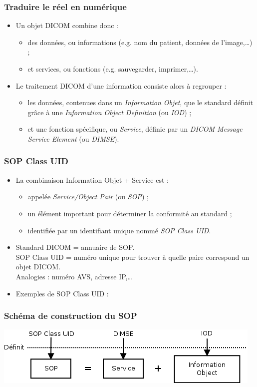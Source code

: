 	\frame
	{
		\frametitle{Traduire le r\'eel en num\'erique}
		
		\begin{itemize}
			\item Un objet DICOM combine donc :
			\begin{itemize}
				\item<2-> des donn\'ees, ou informations (e.g. nom du patient, donn\'ees de l'image,\ldots) ;
				\item<3-> et services, ou fonctions (e.g. sauvegarder, imprimer,\ldots).
			\end{itemize}
			
			\item<4-> Le traitement DICOM d'une information consiste alors \`a regrouper :
			\begin{itemize}
				\item<5-> les donn\'ees, contenues dans un \emph{Information Objet}, que le standard d\'efinit gr\^ace \`a une \emph{Information Object Definition} (ou \emph{IOD}) ;
				\item<6-> et une fonction sp\'ecifique, ou \emph{Service}, d\'efinie par un \emph{DICOM Message Service Element} (ou \emph{DIMSE}).
			\end{itemize}
		\end{itemize}
	}
	
	\frame
	{
		\frametitle{SOP Class UID}

		\begin{itemize}
			\item La combinaison Information Objet + Service est :
			\begin{itemize}
				\item<2-> appel\'ee \emph{Service/Object Pair} (ou \emph{SOP}) ;
				\item<3-> un \'el\'ement important pour d\'eterminer la conformit\'e au standard ;
				\item<4-> identifi\'ee par un identifiant unique nomm\'e \emph{SOP Class UID}.
			\end{itemize}
		
			\item<5-> Standard DICOM = annuaire de SOP.\\
			SOP Class UID = num\'ero unique pour trouver \`a quelle paire correspond un objet DICOM.\\
			Analogies : num\'ero AVS, adresse IP,\ldots

			\item<6-> Exemples de SOP Class UID :
		\end{itemize}
	}
	
	\frame
	{
		\frametitle{Sch\'ema de construction du SOP}
		\begin{center}
			\includegraphics[width=\linewidth]{./figures/sop-definition.png}
		\end{center}		
	}

